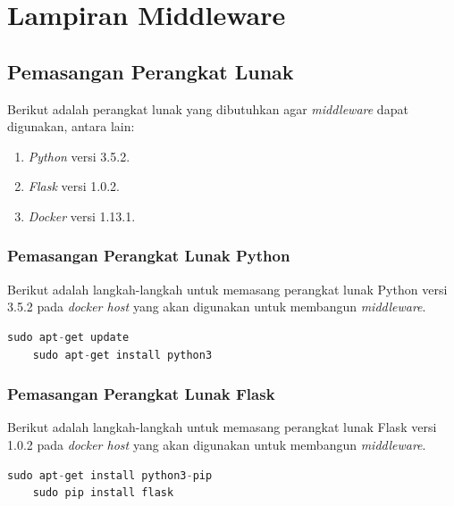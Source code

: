 \chapter{Lampiran Middleware}
\section{Pemasangan Perangkat Lunak}

Berikut adalah perangkat lunak yang dibutuhkan agar \textit{middleware} dapat digunakan, antara lain:
\begin{enumerate}
	\item \textit{Python} versi 3.5.2.
	\item \textit{Flask} versi 1.0.2.
	\item \textit{Docker} versi 1.13.1.
\end{enumerate}

\subsection{Pemasangan Perangkat Lunak Python}
Berikut adalah langkah-langkah untuk memasang perangkat lunak Python versi 3.5.2 pada \textit{docker host} yang akan digunakan untuk membangun \textit{middleware}.\\
\begin{minipage}{\linewidth}
	\begin{lstlisting}[caption=Command untuk installasi Python,language=Python,label=installpython3diserverlogin]
	sudo apt-get update
	sudo apt-get install python3
	\end{lstlisting}
\end{minipage}

\subsection{Pemasangan Perangkat Lunak Flask}
Berikut adalah langkah-langkah untuk memasang perangkat lunak Flask versi 1.0.2 pada \textit{docker host} yang akan digunakan untuk membangun \textit{middleware}.\\
\begin{minipage}{\linewidth}
	\begin{lstlisting}[caption=Command untuk installasi Flask,language=Python,label=installflaskdiserverlogin]
	sudo apt-get install python3-pip
	sudo pip install flask
	\end{lstlisting}
\end{minipage}




